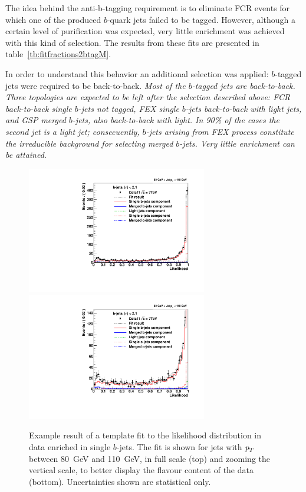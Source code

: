 The idea behind the anti-b-tagging requirement is to eliminate FCR events for which one of the produced $b$-quark jets failed to be tagged. However, although a certain level of purification was expected, very little enrichment was achieved with this kind of selection. The results from these fits are presented in  table~\ref{tb:fitfractions2btagM}.

In order to understand this behavior an additional selection was applied: $b$-tagged jets were required to be back-to-back.   %
\emph{Most of the $b$-tagged jets are back-to-back. Three topologies are expected to be left after the selection described above: FCR back-to-back single $b$-jets not tagged,  FEX single $b$-jets back-to-back with light jets, and GSP merged $b$-jets, also back-to-back with light.  In 90\% of the cases the second jet is a light jet; consecuently, $b$-jets arising from FEX process constitute the irreducible background for selecting merged $b$-jets. Very little enrichment can be attained.}

 
\begin{figure}[tp]
\centering
\includegraphics[width=0.7\textwidth]{FIGS/Fits/LikelihoodFit_3param_ETAFull_DataEnriched2btag_Bin2.pdf}
\includegraphics[width=0.7\textwidth]{FIGS/Fits/LikelihoodFit_3param_ETAFull_DataEnriched2btagZOOM_Bin2.pdf}
\caption{Example result of a template fit to the likelihood distribution in data enriched in single $b$-jets. The fit is shown for jets with ${\emph{p}_{T}}$ between  80~GeV and 110~GeV, in full scale (top) and zooming the vertical scale, to better display the flavour content of the data (bottom). Uncertainties shown are statistical only.}
\label{fig:fitenriched2btag1}
\end{figure}




